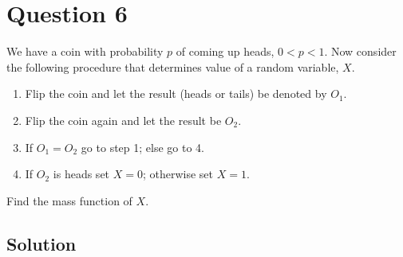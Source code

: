\section*{Question 6}

We have a coin with probability \( p \) of coming up heads, \( 0<p<1 \).
Now consider the following procedure that determines value of a random variable, \( X \).
\begin{enumerate}
    \item Flip the coin and let the result (heads or tails) be denoted by \( O_{1} \).
    \item Flip the coin again and let the result be \( O_{2} \).
    \item If \( O_{1}=O_{2} \) go to step 1; else go to 4.
    \item If \( O_{2} \) is heads set \( X=0 \); otherwise set \( X=1 \).
\end{enumerate}
Find the mass function of \( X \).

\subsection*{Solution}
